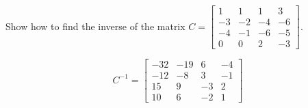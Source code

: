 
\begin{exerciseStatement}


Show how to find the inverse of the matrix \(C= \left[\begin{array}{cccc}
1 & 1 & 1 & 3 \\
-3 & -2 & -4 & -6 \\
-4 & -1 & -6 & -5 \\
0 & 0 & 2 & -3
\end{array}\right] \).


\end{exerciseStatement}
    
\begin{exerciseAnswer} 
\[C^{-1}= \left[\begin{array}{cccc}
-32 & -19 & 6 & -4 \\
-12 & -8 & 3 & -1 \\
15 & 9 & -3 & 2 \\
10 & 6 & -2 & 1
\end{array}\right] \]
\end{exerciseAnswer}
    
